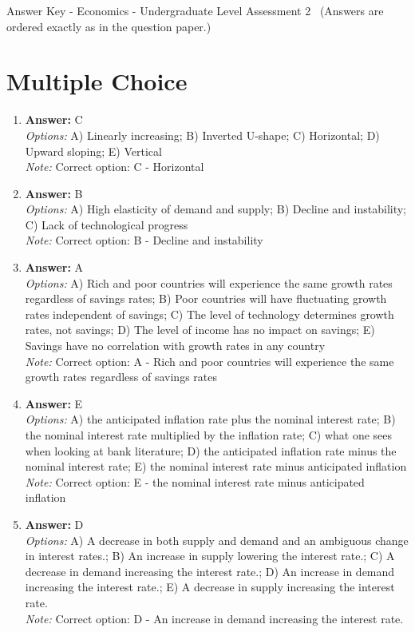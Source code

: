 \documentclass[12pt]{article}
\begin{document}
\begin{center}
Answer Key - Economics - Undergraduate Level Assessment 2 \
\small (Answers are ordered exactly as in the question paper.)
\end{center}

\section*{Multiple Choice}
\begin{enumerate}[label=\arabic*.]
\item \textbf{Answer:} C
\\ \textit{Options:} A) Linearly increasing; B) Inverted U-shape; C) Horizontal; D) Upward sloping; E) Vertical
\\ \textit{Note:} Correct option: C - Horizontal
\item \textbf{Answer:} B
\\ \textit{Options:} A) High elasticity of demand and supply; B) Decline and instability; C) Lack of technological progress
\\ \textit{Note:} Correct option: B - Decline and instability
\item \textbf{Answer:} A
\\ \textit{Options:} A) Rich and poor countries will experience the same growth rates regardless of savings rates; B) Poor countries will have fluctuating growth rates independent of savings; C) The level of technology determines growth rates, not savings; D) The level of income has no impact on savings; E) Savings have no correlation with growth rates in any country
\\ \textit{Note:} Correct option: A - Rich and poor countries will experience the same growth rates regardless of savings rates
\item \textbf{Answer:} E
\\ \textit{Options:} A) the anticipated inflation rate plus the nominal interest rate; B) the nominal interest rate multiplied by the inflation rate; C) what one sees when looking at bank literature; D) the anticipated inflation rate minus the nominal interest rate; E) the nominal interest rate minus anticipated inflation
\\ \textit{Note:} Correct option: E - the nominal interest rate minus anticipated inflation
\item \textbf{Answer:} D
\\ \textit{Options:} A) A decrease in both supply and demand and an ambiguous change in interest rates.; B) An increase in supply lowering the interest rate.; C) A decrease in demand increasing the interest rate.; D) An increase in demand increasing the interest rate.; E) A decrease in supply increasing the interest rate.
\\ \textit{Note:} Correct option: D - An increase in demand increasing the interest rate.
\end{enumerate}
\end{document}
